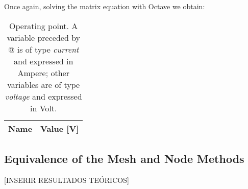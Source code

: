 Once again, solving the matrix equation with Octave we obtain:

\begin{table}[h]
  \centering
  \begin{tabular}{|l|r|}
    \hline    
    {\bf Name} & {\bf Value [V]} \\ \hline
    
  \end{tabular}
  \caption{Operating point. A variable preceded by @ is of type {\em current}
    and expressed in Ampere; other variables are of type {\it voltage} and expressed in
    Volt.}
  \label{tab:op}
\end{table}

\subsection{Equivalence of the Mesh and Node Methods}

[INSERIR RESULTADOS TEÓRICOS]


